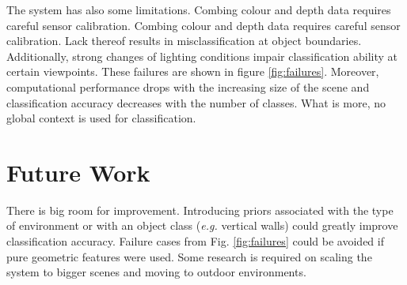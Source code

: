\documentclass{llncs}
\begin{document}
  The system has also some limitations. Combing colour and depth data requires careful sensor calibration. Combing colour and depth data requires careful sensor calibration. Lack thereof results in misclassification at object boundaries. Additionally, strong changes of lighting conditions impair classification ability at certain viewpoints. These failures are shown in figure \ref{fig:failures}. Moreover, computational performance drops with the increasing size of the scene and classification accuracy decreases with the number of classes. What is more, no global context is used for classification. 

\section{Future Work}
  
  There is big room for improvement. Introducing priors associated with the type of environment or with an object class (\emph{e.g.} vertical walls) could greatly improve classification accuracy. Failure cases from Fig. \ref{fig:failures} could be avoided if pure geometric features were used. Some research is required on scaling the system to bigger scenes and moving to outdoor environments. 
\end{document}

